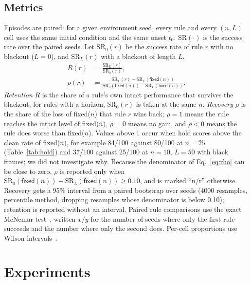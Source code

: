 \documentclass[11pt]{article}
\newcommand{\fixed}{\textsf{fixed}\xspace}
\newcommand{\SR}{\mathrm{SR}}
\begin{document}
\subsection{Metrics}
\label{sec:metrics}
Episodes are paired: for a given environment seed, every rule and every $(n,L)$ cell uses the same initial condition and the same onset $t_0$. $\SR(\cdot)$ is the success rate over the paired seeds. Let $\SR_0(r)$ be the success rate of rule $r$ with no blackout ($L=0$), and $\SR_L(r)$ with a blackout of length $L$.
\begin{align}
  R(r) &= \frac{\SR_L(r)}{\SR_0(r)} ,
  \label{eq:R}\\
  \rho(r) &= \frac{\SR_L(r)-\SR_L(\fixed(n))}{\SR_0(\fixed(n))-\SR_L(\fixed(n))} .
  \label{eq:rho}
\end{align}
\emph{Retention} $R$ is the share of a rule's own intact performance that survives the blackout; for rules with a horizon, $\SR_0(r)$ is taken at the same $n$. \emph{Recovery} $\rho$ is the share of the loss of \fixed($n$) that rule $r$ wins back; $\rho=1$ means the rule reaches the intact level of \fixed($n$), $\rho=0$ means no gain, and $\rho<0$ means the rule does worse than \fixed($n$). Values above 1 occur when hold scores above the clean rate of \fixed($n$), for example 84/100 against 80/100 at $n{=}25$ (Table~\ref{tab:hold}) and 37/100 against 25/100 at $n{=}10$, $L{=}50$ with black frames; we did not investigate why. Because the denominator of Eq.~\eqref{eq:rho} can be close to zero, $\rho$ is reported only when $\SR_0(\fixed(n))-\SR_L(\fixed(n))\ge0.10$, and is marked ``n/r'' otherwise. Recovery gets a 95\% interval from a paired bootstrap over seeds (4000 resamples, percentile method, dropping resamples whose denominator is below 0.10); retention is reported without an interval. Paired rule comparisons use the exact McNemar test~\cite{mcnemar1947note}, written $x/y$ for the number of seeds where only the first rule succeeds and the number where only the second does. Per-cell proportions use Wilson intervals~\cite{wilson1927probable}.

\section{Experiments}
\label{sec:exp}
\end{document}
